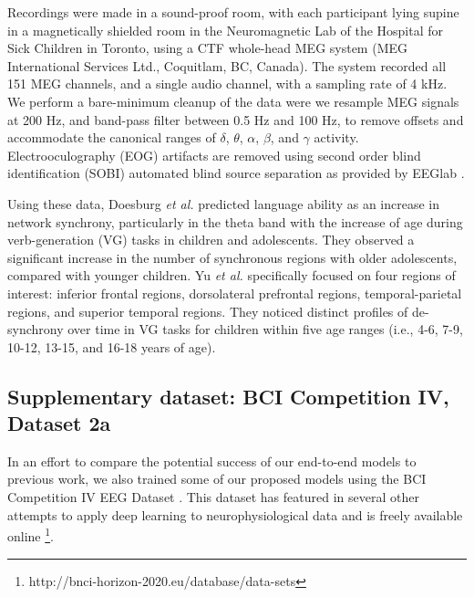 \documentclass[fleqn,10pt]{wlscirep}
\begin{document}
Recordings were made in a sound-proof room, with each participant lying supine in a magnetically shielded room in the Neuromagnetic Lab of the Hospital for Sick Children in Toronto, using a CTF whole-head MEG system (MEG International Services Ltd., Coquitlam, BC, Canada). The system recorded all 151 MEG channels, and a single audio channel, with a sampling rate of 4 kHz. We perform a bare-minimum cleanup of the data were we resample MEG signals at 200 Hz, and band-pass filter between 0.5 Hz and 100 Hz, to remove offsets and accommodate the canonical ranges of $\delta$, $\theta$, $\alpha$, $\beta$, and $\gamma$ activity. Electrooculography (EOG) artifacts are removed using second order blind identification (SOBI) automated blind source separation as provided by EEGlab \cite{Delorme04eeglab}.

Using these data, Doesburg {\em et al.} \cite{Doesburg2016} predicted language ability as an increase in network synchrony, particularly in the theta band with the increase of age during verb-generation (VG) tasks in children and adolescents. They observed a significant increase in the number of synchronous regions with older adolescents, compared with younger children. Yu {\em et al.} \cite{Yu2014} specifically focused on four regions of interest: inferior frontal regions, dorsolateral prefrontal regions, temporal-parietal regions, and superior temporal regions. They noticed distinct profiles of de-synchrony over time in VG tasks for children within five age ranges (i.e., 4-6, 7-9, 10-12, 13-15, and 16-18 years of age).

\subsection*{Supplementary dataset: BCI Competition IV, Dataset 2a}

In an effort to compare the potential success of our end-to-end models to previous work, we also trained some of our proposed models using the BCI Competition IV EEG Dataset \cite{Tangermann2012}. This dataset has featured in several other attempts to apply deep learning to neurophysiological data  and is freely available online \footnote{http://bnci-horizon-2020.eu/database/data-sets}.
\end{document}
